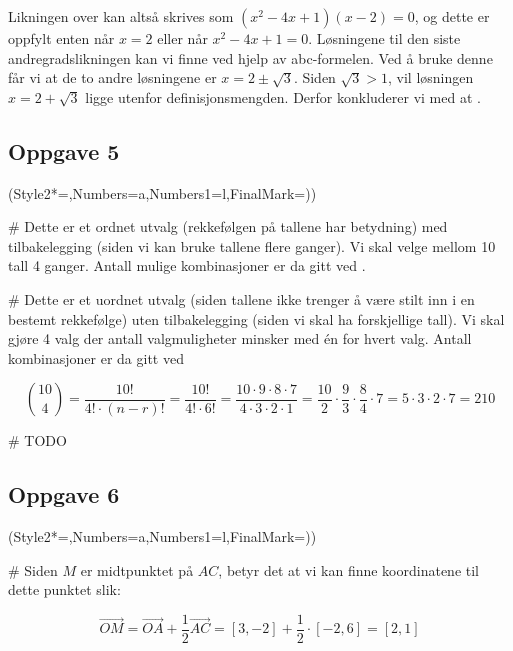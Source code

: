 \begin{easylist}[enumerate]
	
	Likningen over kan altså skrives som $(x^2 - 4x +1)(x-2) = 0$, og dette er oppfylt enten når $x = 2$ eller når $x^2 -4x +1 = 0$. Løsningene til den siste andregradslikningen kan vi finne ved hjelp av abc-formelen. Ved å bruke denne får vi at de to andre løsningene er $x = 2 \pm \sqrt{3}$. Siden $\sqrt{3} > 1$, vil løsningen $x = 2 + \sqrt{3}$ ligge utenfor definisjonsmengden. Derfor konkluderer vi med at .
	
\subsection*{Oppgave 5}
\begin{easylist}[enumerate]
	\ListProperties(Style2*=,Numbers=a,Numbers1=l,FinalMark={)})
	
	# Dette er et ordnet utvalg (rekkefølgen på tallene har betydning) med tilbakelegging (siden vi kan bruke tallene flere ganger). Vi skal velge mellom 10 tall 4 ganger. Antall mulige kombinasjoner er da gitt ved .
	
	# Dette er et uordnet utvalg (siden tallene ikke trenger å være stilt inn i en bestemt rekkefølge) uten tilbakelegging (siden vi skal ha forskjellige tall). Vi skal gjøre 4 valg der antall valgmuligheter minsker med én for hvert valg. Antall kombinasjoner er da gitt ved
	
	$$\binom{10}{4} = \frac{10!}{4! \cdot (n-r)!} = \frac{10!}{4! \cdot 6!} = \frac{10 \cdot 9 \cdot 8 \cdot 7}{4 \cdot 3 \cdot 2 \cdot 1} = \frac{10}{2} \cdot \frac{9}{3} \cdot \frac{8}{4} \cdot 7 = 5 \cdot 3 \cdot 2 \cdot 7 = 210$$
	
	
	# TODO
	
	
	
	
\subsection*{Oppgave 6}
\begin{easylist}[enumerate]
	\ListProperties(Style2*=,Numbers=a,Numbers1=l,FinalMark={)})
	
	# Siden $M$ er midtpunktet på $AC$, betyr det at vi kan finne koordinatene til dette punktet slik:
	
	\[ \vec{OM} = \vec{OA} + \frac{1}{2} \vec{AC} = [3,-2] + \frac{1}{2} \cdot [-2,6]  = [2,1]\]
	

\end{easylist}
\end{easylist}
\end{easylist}
